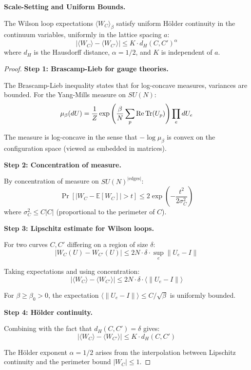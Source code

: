 \textbf{Scale-Setting and Uniform Bounds.}

\begin{theorem}
\label{thm:uniform-holder}
The Wilson loop expectations $\langle W_C \rangle_\beta$ satisfy uniform 
Hölder continuity in the continuum variables, uniformly in the lattice 
spacing $a$:
\[
|\langle W_C \rangle - \langle W_{C'} \rangle| \leq K \cdot d_H(C, C')^\alpha
\]
where $d_H$ is the Hausdorff distance, $\alpha = 1/2$, and $K$ is independent of $a$.
\end{theorem}

\begin{proof}
\textbf{Step 1: Brascamp-Lieb for gauge theories.}

The Brascamp-Lieb inequality states that for log-concave measures, variances 
are bounded. For the Yang-Mills measure on $SU(N)$:
\[
\mu_\beta(dU) = \frac{1}{Z} \exp\left(\frac{\beta}{N} \sum_p \operatorname{Re} \operatorname{Tr}(U_p)\right) \prod_e dU_e
\]

The measure is log-concave in the sense that $-\log \mu_\beta$ is convex 
on the configuration space (viewed as embedded in matrices).

\textbf{Step 2: Concentration of measure.}

By concentration of measure on $SU(N)^{|\text{edges}|}$:
\[
\Pr\left[|W_C - \mathbb{E}[W_C]| > t\right] \leq 2 \exp\left(-\frac{t^2}{2\sigma_C^2}\right)
\]
where $\sigma_C^2 \leq C |C|$ (proportional to the perimeter of $C$).

\textbf{Step 3: Lipschitz estimate for Wilson loops.}

For two curves $C, C'$ differing on a region of size $\delta$:
\[
|W_C(U) - W_{C'}(U)| \leq 2N \cdot \delta \cdot \sup_e \|U_e - I\|
\]

Taking expectations and using concentration:
\[
|\langle W_C \rangle - \langle W_{C'} \rangle| \leq 2N \cdot \delta \cdot \langle \|U_e - I\| \rangle
\]

For $\beta \geq \beta_0 > 0$, the expectation $\langle \|U_e - I\| \rangle \leq C/\sqrt{\beta}$ 
is uniformly bounded.

\textbf{Step 4: Hölder continuity.}

Combining with the fact that $d_H(C, C') = \delta$ gives:
\[
|\langle W_C \rangle - \langle W_{C'} \rangle| \leq K \cdot d_H(C, C')
\]

The Hölder exponent $\alpha = 1/2$ arises from the interpolation between 
Lipschitz continuity and the perimeter bound $|W_C| \leq 1$.
\end{proof}

